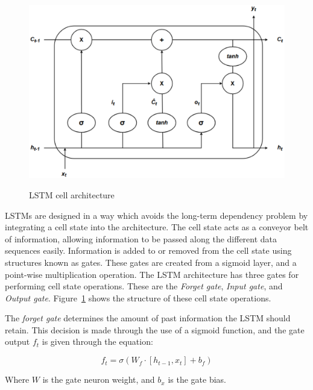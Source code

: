 \begin{figure}[htb]
    \centering
    \caption{LSTM cell architecture}
    \includegraphics[width=0.8\linewidth]{Figures/LSTM-Cell-Architecture.pdf}
    \label{fig:lstm-cell-architecture}
\end{figure}

LSTMs are designed in a way which avoids the long-term dependency problem by integrating a cell state into the architecture. The cell state acts as a conveyor belt of information, allowing information to be passed along the different data sequences easily. Information is added to or removed from the cell state using structures known as gates. These gates are created from a sigmoid layer, and a point-wise multiplication operation. The LSTM architecture has three gates for performing cell state operations. These are the \textit{Forget gate}, \textit{Input gate}, and \textit{Output gate}. Figure~\ref{fig:lstm-cell-architecture} shows the structure of these cell state operations.\par

The \textit{forget gate} determines the amount of past information the LSTM should retain. This decision is made through the use of a sigmoid function, and the gate output $f_{t}$ is given through the equation:

\begin{equation}
    f_{t} = \sigma(W_{f}\cdot[h_{t-1}, x_{t}] + b_{f})
\end{equation}

Where $W$ is the gate neuron weight, and $b_{x}$ is the gate bias.\par

